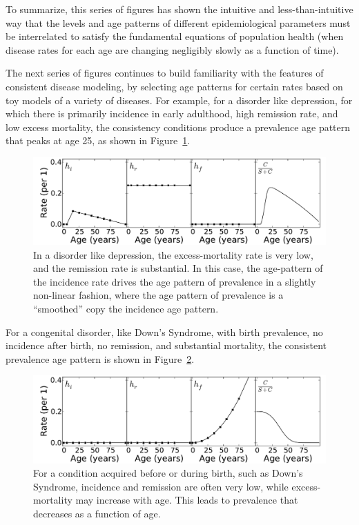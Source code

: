 To summarize, this series of figures has shown the intuitive and less-than-intuitive way that the levels and age patterns of different epidemiological parameters must be interrelated to satisfy the fundamental equations of population health (when disease rates for each age are changing negligibly slowly as a function of time).

The next series of figures continues to build familiarity with the features of consistent disease modeling, by selecting age patterns for certain rates based on toy models of a variety of diseases.  For example, for a disorder like depression, for which there is primarily incidence in early adulthood, high remission rate, and low excess mortality, the consistency conditions produce a prevalence age pattern that peaks at age 25, as shown in Figure~\ref{forward-sim_mental}.

\begin{figure}
\begin{center}
\includegraphics[width=\textwidth]{forward-sim-mental.pdf}
\caption{
In a disorder like depression, the excess-mortality rate is very low, and the remission rate is substantial.  In this case, the age-pattern of the incidence rate drives the age pattern of prevalence in a slightly non-linear fashion, where the age pattern of prevalence is a ``smoothed'' copy the incidence age pattern.
}
\label{forward-sim_mental}
\end{center}
\end{figure}

For a congenital disorder, like Down's Syndrome, with birth prevalence, no incidence after birth, no remission, and substantial mortality, the consistent prevalence age pattern is shown in Figure~\ref{forward-sim-congenital}.

\begin{figure}[h]
\begin{center}
\includegraphics[width=\textwidth]{forward-sim-congenital.pdf}
\caption{For a condition acquired before or during birth, such as Down's Syndrome, incidence and remission are often very low, while excess-mortality may increase with age.  This leads to prevalence that decreases as a function of age.}
\label{forward-sim-congenital}
\end{center}
\end{figure}

